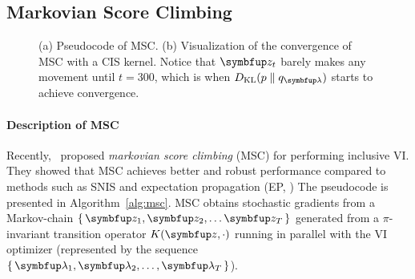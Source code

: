 \subsection{Markovian Score Climbing}\label{section:msc}
%
\begin{figure}[H]
  \vspace{-0.1in}
  \small
  \centering
  \subfloat[]{
      \label{fig:motivating}
  }
  \caption{(a) Pseudocode of MSC. (b) Visualization of the convergence of MSC with a CIS kernel.
    Notice that \(\vz_t\) barely makes any movement until \(t=300\), which is when \(\DKL{p}{q_{\vlambda}}\) starts to achieve convergence.}
\end{figure}
%
%
\vspace{-0.1in}
\paragraph{Description of MSC}
Recently,~\citet{NEURIPS2020_b2070693} proposed \textit{markovian score climbing} (MSC) for performing inclusive VI.
They showed that MSC achieves better and robust performance compared to methods such as SNIS and expectation propagation (EP, \citealt{10.5555/2074022.2074067})
The pseudocode is presented in Algorithm~\ref{alg:msc}.
MSC obtains stochastic gradients from a Markov-chain \(\{\,\vz_1, \vz_2, \ldots \vz_T\,\}\) generated from a \(\pi\)-invariant transition operator \(K(\vz, \cdot)\) running in parallel with the VI optimizer (represented by the sequence \(\{\,\vlambda_1, \vlambda_2, \ldots, \vlambda_T\,\}\)).

